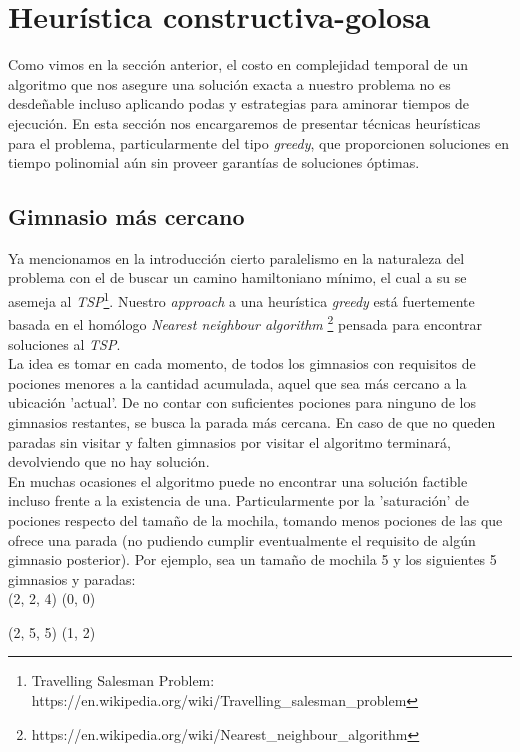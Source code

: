 \section{Heurística constructiva-golosa}
    Como vimos en la sección anterior, el costo en complejidad temporal de un algoritmo que nos asegure una solución exacta a nuestro problema no es desdeñable incluso aplicando podas y estrategias para aminorar tiempos de ejecución. En esta sección nos encargaremos de presentar técnicas heurísticas para el problema, particularmente del tipo \emph{greedy}, que proporcionen soluciones en tiempo polinomial aún sin proveer garantías de soluciones óptimas.

\subsection{Gimnasio más cercano}
    Ya mencionamos en la introducción cierto paralelismo en la naturaleza del problema con el de buscar un camino hamiltoniano mínimo, el cual a su se asemeja al \emph{TSP}\footnote{Travelling Salesman Problem: https://en.wikipedia.org/wiki/Travelling_salesman_problem}. Nuestro \emph{approach} a una heurística \emph{greedy} está fuertemente basada en el homólogo \emph{Nearest neighbour algorithm} \footnote{https://en.wikipedia.org/wiki/Nearest_neighbour_algorithm} pensada para encontrar soluciones al \emph{TSP}.
    \\

    La idea es tomar en cada momento, de todos los gimnasios con requisitos de pociones menores a la cantidad acumulada, aquel que sea más cercano a la ubicación 'actual'. De no contar con suficientes pociones para ninguno de los gimnasios restantes, se busca la parada más cercana. En caso de que no queden paradas sin visitar y falten gimnasios por visitar el algoritmo terminará, devolviendo que no hay solución.
    \\

    En muchas ocasiones el algoritmo puede no encontrar una solución factible incluso frente a la existencia de una. Particularmente por la 'saturación' de pociones respecto del tamaño de la mochila, tomando menos pociones de las que ofrece una parada (no pudiendo cumplir eventualmente el requisito de algún gimnasio posterior). Por ejemplo, sea un tamaño de mochila 5 y los siguientes 5 gimnasios y paradas:
    \\

    (2, 2, 4)     \quad  \quad  (0, 0)

    (2, 5, 5)      \quad \quad  (1, 2)

